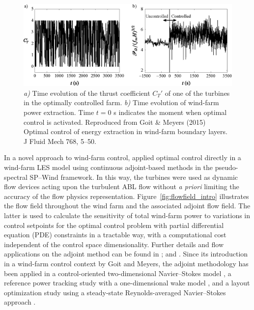 \begin{figure}
	\includegraphics[width=\textwidth]{chapters/introduction/goit_meyers.eps}
	\caption{\emph{a)} Time evolution of the thrust coefficient $C_T'$ of one of the turbines in the optimally controlled farm. \emph{b)} Time evolution of wind-farm power extraction. Time $t = 0$ s indicates the moment when optimal control is activated. \label{fig:goitjfm} Reproduced from Goit \& Meyers (2015) Optimal control of energy extraction in wind-farm boundary layers. J Fluid Mech 768, 5--50. \label{fig:ct_power_goit}}
\end{figure}

In a novel approach to wind-farm control, \cite{goit2015optimal} applied optimal control directly in a wind-farm LES model using continuous adjoint-based methods in the pseudo-spectral SP--Wind framework. In this way, the turbines were used as dynamic flow devices acting upon the turbulent ABL flow without \emph{a priori} limiting the accuracy of the flow physics representation. Figure~\ref{fig:flowfield_intro} illustrates the flow field throughout the wind farm and the associated adjoint flow field. The latter is used to calculate the sensitivity of total wind-farm power to variations in control setpoints for the optimal control problem with partial differential equation (PDE) constraints in a tractable way, with a computational cost independent of the control space dimensionality. Further details and flow applications on the adjoint method can be found in \cite{giles2000introduction,bewley2001dns}; and \cite{troltzsch}. Since its introduction in a wind-farm control context by Goit and Meyers, the adjoint methodology has been applied in a control-oriented two-dimensional Navier--Stokes model \citep{boersma2016control,vali2016predictive}, a reference power tracking study with a one-dimensional wake model \citep{shapiro2017model}, and a layout optimization study using a steady-state Reynolds-averaged Navier--Stokes approach \citep{king2017optimization}.


